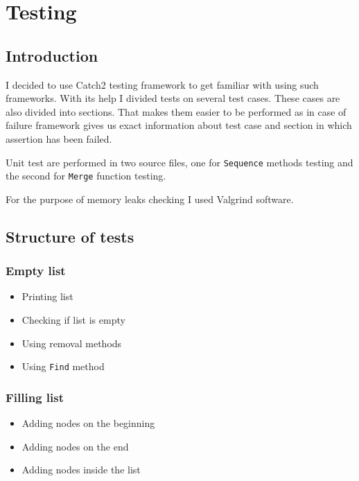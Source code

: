 \documentclass{article}
\begin{document}
\section{Testing}

\subsection{Introduction}

I decided to use Catch2 testing framework to get familiar with using such frameworks.
With its help I divided tests on several test cases. These cases are also divided into
sections. That makes them easier to be performed as in case of failure framework
gives us exact information about test case and section in which assertion has been failed.

\indent
Unit test are performed in two source files, one for {\tt Sequence} methods testing and the second
for {\tt Merge} function testing.

\indent
For the purpose of memory leaks checking I used Valgrind software.

\subsection{Structure of tests}

\subsubsection*{Empty list}

\begin{itemize}
    \item Printing list
    \item Checking if list is empty
    \item Using removal methods
    \item Using {\tt Find} method
\end{itemize}

\subsubsection*{Filling list}

\begin{itemize}
    \item Adding nodes on the beginning
    \item Adding nodes on the end
    \item Adding nodes inside the list
\end{itemize}
\end{document}
